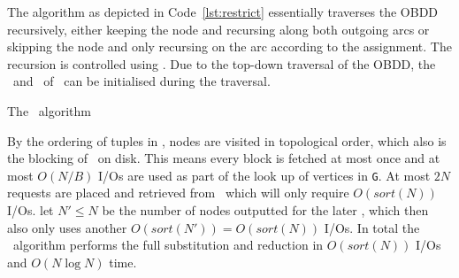 The algorithm as depicted in Code~\ref{lst:restrict} essentially traverses the
OBDD recursively, either keeping the node and recursing along both outgoing arcs
or skipping the node and only recursing on the arc according to the assignment.
The recursion is controlled using \RestrictQrec. Due to the top-down traversal
of the OBDD, the \ReduceLforward\ and \ReduceQdep\ of \Reduce\ can be
initialised during the traversal.

\begin{lstfloat}
  \centering

  

  \caption{The \Restrict\ algorithm}
  \label{lst:restrict}
\end{lstfloat}

By the ordering of tuples in \RestrictQrec, nodes are visited in topological
order, which also is the blocking of \GV\ on disk. This means every block is
fetched at most once and at most $O(N/B)$ I/Os are used as part of the look up
of vertices in \lstinline{G}. At most $2N$ requests are placed and retrieved
from \Q\ which will only require $O(sort(N))$ I/Os. let $N' \leq N$ be the
number of nodes outputted for the later \Reduce, which then also only uses
another $O(sort(N')) = O(sort(N))$ I/Os. In total the \Restrict\ algorithm
performs the full substitution and reduction in $O(sort(N))$ I/Os and $O(N \log
N)$ time.

\clearpage
